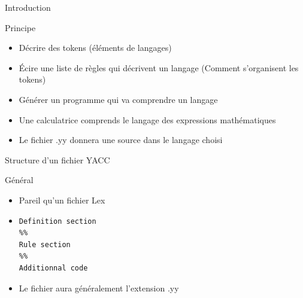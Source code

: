 \def\ftitle{Introduction}
\begin{frame}[containsverbatim]{\ftitle}
\def\blocktitle{Principe}
\begin{block}{\blocktitle}
\begin{itemize}
\item Décrire des tokens (éléments de langages)
\item Écire une liste de règles qui décrivent un langage (Comment s'organisent les tokens)
\item Générer un programme qui va comprendre un langage
\item Une calculatrice comprends le langage des expressions mathématiques
\item Le fichier .yy donnera une source dans le langage choisi
\end{itemize}
\end{block}
\end{frame}


\def\ftitle{Structure d'un fichier YACC}
\begin{frame}[containsverbatim]{\ftitle}
\def\blocktitle{Général}
\begin{block}{\blocktitle}
\begin{itemize}
\item Pareil qu'un fichier Lex
\item \begin{verbatim}
Definition section
%%
Rule section
%%
Additionnal code
\end{verbatim}
\item Le fichier aura généralement l'extension .yy
\end{itemize}
\end{block}
\end{frame}



